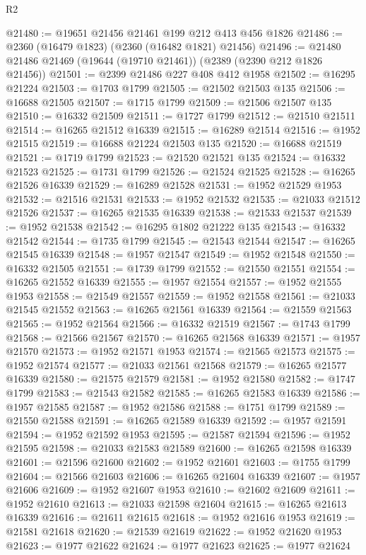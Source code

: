 \begin{lexlean}{R2}
\begin{coremodule}
@21480 := @19651 @21456 @21461 @199 @212 @413 @456 @1826
@21486 := @2360 (@16479 @1823) (@2360 (@16482 @1821) @21456)
@21496 := @21480 @21486 @21469 (@19644 (@19710 @21461)) (@2389 (@2390 @212 @1826 @21456))
@21501 := @2399 @21486 @227 @408 @412 @1958
@21502 := @16295 @21224
@21503 := @1703 @1799
@21505 := @21502 @21503 @135
@21506 := @16688 @21505
@21507 := @1715 @1799
@21509 := @21506 @21507 @135
@21510 := @16332 @21509
@21511 := @1727 @1799
@21512 := @21510 @21511
@21514 := @16265 @21512 @16339
@21515 := @16289 @21514
@21516 := @1952 @21515
@21519 := @16688 @21224 @21503 @135
@21520 := @16688 @21519
@21521 := @1719 @1799
@21523 := @21520 @21521 @135
@21524 := @16332 @21523
@21525 := @1731 @1799
@21526 := @21524 @21525
@21528 := @16265 @21526 @16339
@21529 := @16289 @21528
@21531 := @1952 @21529 @1953
@21532 := @21516 @21531
@21533 := @1952 @21532
@21535 := @21033 @21512 @21526
@21537 := @16265 @21535 @16339
@21538 := @21533 @21537
@21539 := @1952 @21538
@21542 := @16295 @1802 @21222 @135
@21543 := @16332 @21542
@21544 := @1735 @1799
@21545 := @21543 @21544
@21547 := @16265 @21545 @16339
@21548 := @1957 @21547
@21549 := @1952 @21548
@21550 := @16332 @21505
@21551 := @1739 @1799
@21552 := @21550 @21551
@21554 := @16265 @21552 @16339
@21555 := @1957 @21554
@21557 := @1952 @21555 @1953
@21558 := @21549 @21557
@21559 := @1952 @21558
@21561 := @21033 @21545 @21552
@21563 := @16265 @21561 @16339
@21564 := @21559 @21563
@21565 := @1952 @21564
@21566 := @16332 @21519
@21567 := @1743 @1799
@21568 := @21566 @21567
@21570 := @16265 @21568 @16339
@21571 := @1957 @21570
@21573 := @1952 @21571 @1953
@21574 := @21565 @21573
@21575 := @1952 @21574
@21577 := @21033 @21561 @21568
@21579 := @16265 @21577 @16339
@21580 := @21575 @21579
@21581 := @1952 @21580
@21582 := @1747 @1799
@21583 := @21543 @21582
@21585 := @16265 @21583 @16339
@21586 := @1957 @21585
@21587 := @1952 @21586
@21588 := @1751 @1799
@21589 := @21550 @21588
@21591 := @16265 @21589 @16339
@21592 := @1957 @21591
@21594 := @1952 @21592 @1953
@21595 := @21587 @21594
@21596 := @1952 @21595
@21598 := @21033 @21583 @21589
@21600 := @16265 @21598 @16339
@21601 := @21596 @21600
@21602 := @1952 @21601
@21603 := @1755 @1799
@21604 := @21566 @21603
@21606 := @16265 @21604 @16339
@21607 := @1957 @21606
@21609 := @1952 @21607 @1953
@21610 := @21602 @21609
@21611 := @1952 @21610
@21613 := @21033 @21598 @21604
@21615 := @16265 @21613 @16339
@21616 := @21611 @21615
@21618 := @1952 @21616 @1953
@21619 := @21581 @21618
@21620 := @21539 @21619
@21622 := @1952 @21620 @1953
@21623 := @1977 @21622
@21624 := @1977 @21623
@21625 := @1977 @21624

\end{coremodule}
\end{lexlean}

